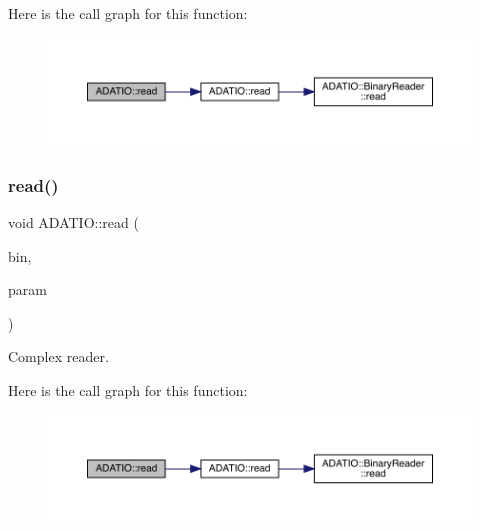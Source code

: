Here is the call graph for this function\+:
\nopagebreak
\begin{figure}[H]
\begin{center}
\leavevmode
\includegraphics[width=350pt]{d0/dba/namespaceADATIO_aa439c7d6dfc63d8424816de24810141d_cgraph}
\end{center}
\end{figure}
\mbox{\label{namespaceADATIO_a99479bf376afa5196fad6684a360c7af}} 
\subsubsection{\texorpdfstring{read()}{read()}\hspace{0.1cm}{\footnotesize\ttfamily [15/28]}}
{\footnotesize\ttfamily void A\+D\+A\+T\+I\+O\+::read (\begin{DoxyParamCaption}\item[{\mbox{\hyperlink{classADATIO_1_1BinaryReader}{Binary\+Reader}} \&}]{bin,  }\item[{std\+::complex$<$ double $>$ \&}]{param }\end{DoxyParamCaption})}



Complex reader. 

Here is the call graph for this function\+:
\nopagebreak
\begin{figure}[H]
\begin{center}
\leavevmode
\includegraphics[width=350pt]{d0/dba/namespaceADATIO_a99479bf376afa5196fad6684a360c7af_cgraph}
\end{center}
\end{figure}
\mbox{\label{namespaceADATIO_a16a912dec3b1d1424a44c9f1a6cd915f}} 
